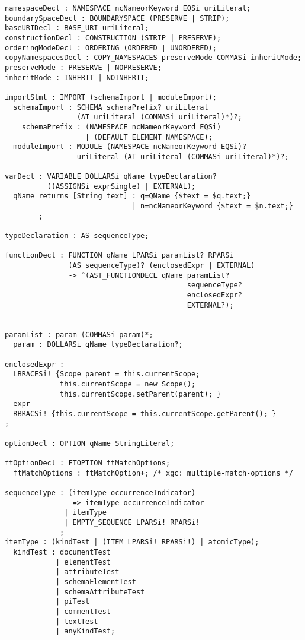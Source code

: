 \begin{verbatim}
namespaceDecl : NAMESPACE ncNameorKeyword EQSi uriLiteral;
boundarySpaceDecl : BOUNDARYSPACE (PRESERVE | STRIP);
baseURIDecl : BASE_URI uriLiteral;
constructionDecl : CONSTRUCTION (STRIP | PRESERVE);
orderingModeDecl : ORDERING (ORDERED | UNORDERED);
copyNamespacesDecl : COPY_NAMESPACES preserveMode COMMASi inheritMode;
preserveMode : PRESERVE | NOPRESERVE;
inheritMode : INHERIT | NOINHERIT;  

importStmt : IMPORT (schemaImport | moduleImport);
  schemaImport : SCHEMA schemaPrefix? uriLiteral 
                 (AT uriLiteral (COMMASi uriLiteral)*)?;
    schemaPrefix : (NAMESPACE ncNameorKeyword EQSi) 
                   | (DEFAULT ELEMENT NAMESPACE);
  moduleImport : MODULE (NAMESPACE ncNameorKeyword EQSi)? 
                 uriLiteral (AT uriLiteral (COMMASi uriLiteral)*)?;

varDecl : VARIABLE DOLLARSi qName typeDeclaration? 
          ((ASSIGNSi exprSingle) | EXTERNAL);
  qName returns [String text] : q=QName {$text = $q.text;}
                              | n=ncNameorKeyword {$text = $n.text;}
        ;

typeDeclaration : AS sequenceType;
  
functionDecl : FUNCTION qName LPARSi paramList? RPARSi 
               (AS sequenceType)? (enclosedExpr | EXTERNAL)
               -> ^(AST_FUNCTIONDECL qName paramList?
                                           sequenceType?
                                           enclosedExpr?
                                           EXTERNAL?);


paramList : param (COMMASi param)*;
  param : DOLLARSi qName typeDeclaration?;

enclosedExpr :
  LBRACESi! {Scope parent = this.currentScope;
             this.currentScope = new Scope();
             this.currentScope.setParent(parent); }
  expr
  RBRACSi! {this.currentScope = this.currentScope.getParent(); }
;

optionDecl : OPTION qName StringLiteral;

ftOptionDecl : FTOPTION ftMatchOptions;
  ftMatchOptions : ftMatchOption+; /* xgc: multiple-match-options */

sequenceType : (itemType occurrenceIndicator) 
                => itemType occurrenceIndicator
              | itemType
              | EMPTY_SEQUENCE LPARSi! RPARSi!
             ;
itemType : (kindTest | (ITEM LPARSi! RPARSi!) | atomicType);
  kindTest : documentTest
            | elementTest
            | attributeTest
            | schemaElementTest
            | schemaAttributeTest
            | piTest
            | commentTest
            | textTest
            | anyKindTest;


\end{verbatim}

